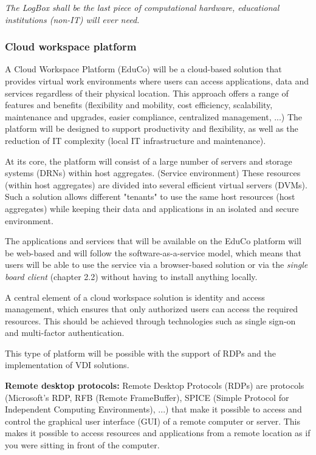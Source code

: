 \documentclass[]{article}
\begin{document}
\textit{The LogBox shall be the last piece of computational hardware, educational institutions (non-IT) will ever need.}  

\subsubsection{Cloud workspace platform}
A Cloud Workspace Platform (EduCo) will be a cloud-based solution that provides virtual work environments where users can access applications, data and services regardless of their physical location. 
This approach offers a range of features and benefits (flexibility and mobility, cost efficiency, scalability, maintenance and upgrades, easier compliance, centralized management, ...)
The platform will be designed to support productivity and flexibility, as well as the reduction of IT complexity (local IT infrastructure and maintenance). 

At its core, the platform will consist of a large number of servers and storage systems (DRNs) within host aggregates. (Service environment) 
These resources (within host aggregates) are divided into several efficient virtual servers (DVMs).
Such a solution allows different "tenants" to use the same host resources (host aggregates) while keeping their data and applications in an isolated and secure environment.

The applications and services that will be available on the EduCo platform will be web-based and will follow the software-as-a-service model, which means that users will be able to use the service via a browser-based solution or via the \textit{single board client} (chapter 2.2) without having to install anything locally.

A central element of a cloud workspace solution is identity and access management, which ensures that only authorized users can access the required resources. 
This should be achieved through technologies such as single sign-on and multi-factor authentication.

This type of platform will be possible with the support of RDPs and the implementation of VDI solutions.
\newline

\textbf{Remote desktop protocols:}
Remote Desktop Protocols (RDPs) \cite{WikipediaDoc-rdp} are protocols (Microsoft's RDP, RFB (Remote FrameBuffer), SPICE (Simple Protocol for Independent Computing Environments), ...) that make it possible to access and control the graphical user interface (GUI) of a remote computer or server. 
This makes it possible to access resources and applications from a remote location as if you were sitting in front of the computer.
\newline
\end{document}
